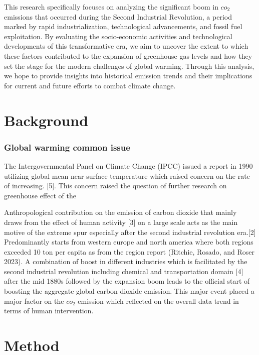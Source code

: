 \documentclass[
]{article}
\begin{document}
This research specifically focuses on analyzing the significant boom in
\(co_2\) emissions that occurred during the Second Industrial
Revolution, a period marked by rapid industrialization, technological
advancements, and fossil fuel exploitation. By evaluating the
socio-economic activities and technological developments of this
transformative era, we aim to uncover the extent to which these factors
contributed to the expansion of greenhouse gas levels and how they set
the stage for the modern challenges of global warming. Through this
analysis, we hope to provide insights into historical emission trends
and their implications for current and future efforts to combat climate
change.

\hypertarget{background}{%
\section{Background}\label{background}}

\hypertarget{global-warming-common-issue}{%
\subsubsection{Global warming common
issue}\label{global-warming-common-issue}}

The Intergovernmental Panel on Climate Change (IPCC) issued a report in
1990 utilizing global mean near surface temperature which raised concern
on the rate of increasing. {[}5{]}. This concern raised the question of
further research on greenhouse effect of the

Anthropological contribution on the emission of carbon dioxide that
mainly draws from the effect of human activity {[}3{]} on a large scale
acts as the main motive of the extreme spur especially after the second
industrial revolution era.{[}2{]} Predominantly starts from western
europe and north america where both regions exceeded 10 ton per capita
as from the region report (Ritchie, Rosado, and Roser 2023). A
combination of boost in different industries which is facilitated by the
second industrial revolution including chemical and transportation
domain {[}4{]} after the mid 1880s followed by the expansion boom leads
to the official start of boosting the aggregate global carbon dioxide
emission. This major event placed a major factor on the \(co_2\)
emission which reflected on the overall data trend in terms of human
intervention.

\hypertarget{method}{%
\section{Method}\label{method}}
\end{document}
